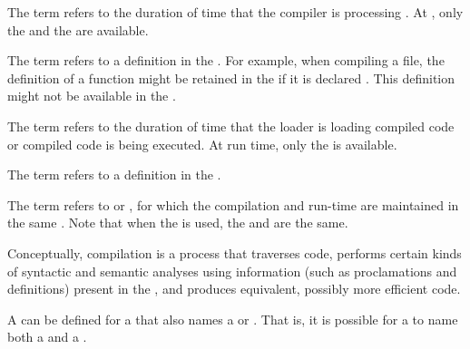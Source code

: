 The term  refers to the duration of time that
the compiler is processing .
At ,
only the  
and  the 
are available.

The term  refers to a definition in
the .
For example, when compiling a file, 
the definition of a function might be retained in the  
if it is declared . 
This definition might not be available in the .

The term  refers to the duration of time that the
loader is loading compiled code or compiled code is being executed.
At run time, only the  is available.

The term  refers to a definition in the
.

The term  refers to 
or , for which the compilation and run-time 
 are maintained in the same .
Note that when the  is used,
the  
and  
are the same.

\endsubSection%
 
 
Conceptually, compilation is a process that traverses code, performs
certain kinds of syntactic and semantic analyses using information
(such as proclamations and  definitions) present in the
, and produces equivalent, possibly
more efficient code.



A  can be defined for a 
that also names a  or .
That is, it is possible for a
 to name both a  and a .

